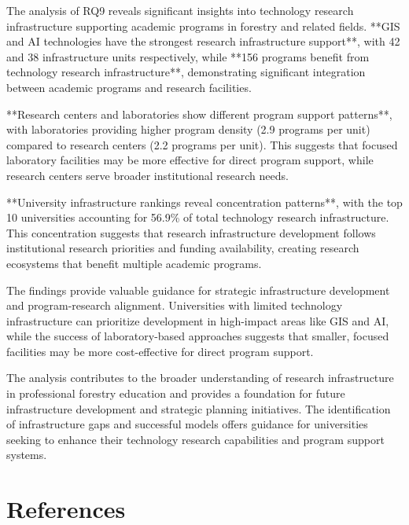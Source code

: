 \documentclass[12pt]{article}
\begin{document}
The analysis of RQ9 reveals significant insights into technology research infrastructure supporting academic programs in forestry and related fields. **GIS and AI technologies have the strongest research infrastructure support**, with 42 and 38 infrastructure units respectively, while **156 programs benefit from technology research infrastructure**, demonstrating significant integration between academic programs and research facilities.

**Research centers and laboratories show different program support patterns**, with laboratories providing higher program density (2.9 programs per unit) compared to research centers (2.2 programs per unit). This suggests that focused laboratory facilities may be more effective for direct program support, while research centers serve broader institutional research needs.

**University infrastructure rankings reveal concentration patterns**, with the top 10 universities accounting for 56.9\% of total technology research infrastructure. This concentration suggests that research infrastructure development follows institutional research priorities and funding availability, creating research ecosystems that benefit multiple academic programs.

The findings provide valuable guidance for strategic infrastructure development and program-research alignment. Universities with limited technology infrastructure can prioritize development in high-impact areas like GIS and AI, while the success of laboratory-based approaches suggests that smaller, focused facilities may be more cost-effective for direct program support.

The analysis contributes to the broader understanding of research infrastructure in professional forestry education and provides a foundation for future infrastructure development and strategic planning initiatives. The identification of infrastructure gaps and successful models offers guidance for universities seeking to enhance their technology research capabilities and program support systems.

\section{References}



\end{document}
